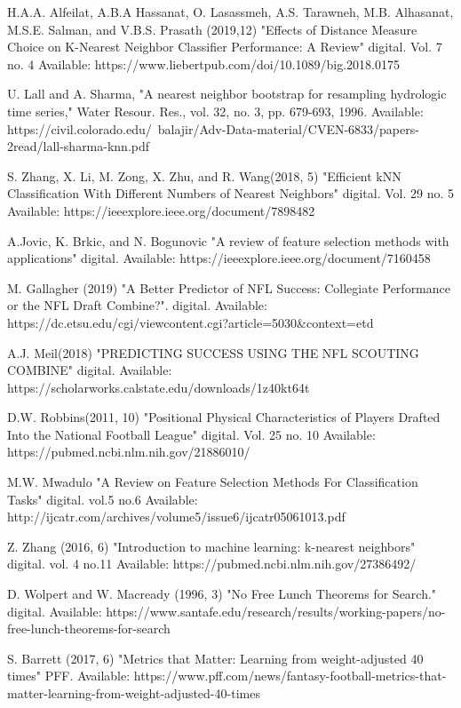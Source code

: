 \documentclass[confrence]{IEEEtran}
\begin{document}
H.A.A. Alfeilat, A.B.A Hassanat, O. Lasassmeh, A.S. Tarawneh, M.B. Alhasanat, M.S.E. Salman, and V.B.S. Prasath (2019,12) "Effects of Distance Measure Choice on K-Nearest Neighbor Classifier Performance: A Review" digital. Vol. 7 no. 4 Available: https://www.liebertpub.com/doi/10.1089/big.2018.0175

U. Lall and A. Sharma, "A nearest neighbor bootstrap for resampling hydrologic time series," Water Resour. Res., vol. 32, no. 3, pp. 679-693, 1996. Available: https://civil.colorado.edu/~balajir/Adv-Data-material/CVEN-6833/papers-2read/lall-sharma-knn.pdf

S. Zhang, X. Li, M. Zong, X. Zhu, and R. Wang(2018, 5) "Efficient kNN Classification With Different Numbers of Nearest Neighbors" digital. Vol. 29 no. 5 Available: https://ieeexplore.ieee.org/document/7898482

A.Jovic, K. Brkic, and N. Bogunovic "A review of feature selection methods with applications" digital. Available: https://ieeexplore.ieee.org/document/7160458

M. Gallagher (2019) "A Better Predictor of NFL Success: Collegiate Performance or the NFL Draft Combine?". digital. Available: https://dc.etsu.edu/cgi/viewcontent.cgi?article=5030&context=etd

A.J. Meil(2018) "PREDICTING SUCCESS USING THE NFL SCOUTING COMBINE" digital. Available: https://scholarworks.calstate.edu/downloads/1z40kt64t

D.W. Robbins(2011, 10) "Positional Physical Characteristics of Players Drafted Into the National Football League" digital. Vol. 25 no. 10 Available: https://pubmed.ncbi.nlm.nih.gov/21886010/

M.W. Mwadulo "A Review on Feature Selection Methods For Classification Tasks" digital. vol.5 no.6 Available: http://ijcatr.com/archives/volume5/issue6/ijcatr05061013.pdf

Z. Zhang (2016, 6) "Introduction to machine learning: k-nearest neighbors" digital. vol. 4 no.11 Available: https://pubmed.ncbi.nlm.nih.gov/27386492/

D. Wolpert and W. Macready (1996, 3) "No Free Lunch Theorems for Search." digital. Available: https://www.santafe.edu/research/results/working-papers/no-free-lunch-theorems-for-search

S. Barrett (2017, 6) "Metrics that Matter: Learning from weight-adjusted 40 times" PFF. Available: https://www.pff.com/news/fantasy-football-metrics-that-matter-learning-from-weight-adjusted-40-times
\end{document}
